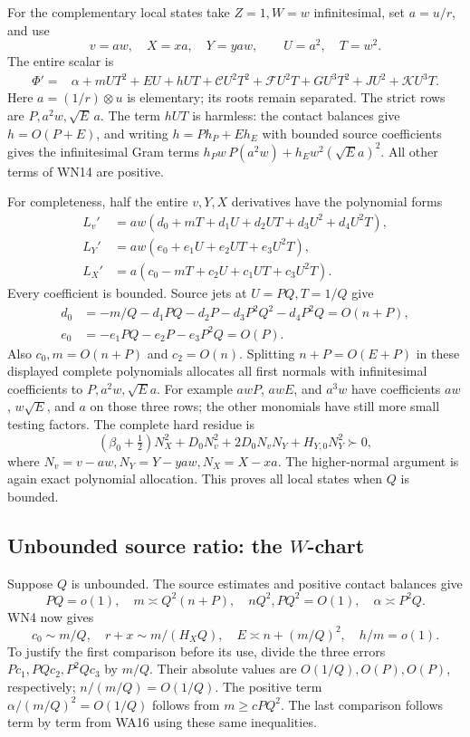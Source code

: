 For the complementary local states take \(Z=1,W=w\) infinitesimal,
set \(a=u/r\), and use
\[
 v=aw,\quad X=xa,\quad Y=yaw,\qquad U=a^2,\quad T=w^2.
 \tag{WN13}
\]
The entire scalar is
\[
\begin{split}
 \Phi'={}&\alpha+mUT^2+EU+hUT+\mathcal C U^2T^2
       +\mathcal F U^2T+GU^3T^2+JU^2+\mathcal K U^3T .
\end{split}\tag{WN14}
\]
Here \(a=(1/r)\otimes u\) is elementary; its roots remain separated.
The strict rows are \(P,a^2w,\sqrt E\,a\).
The term \(hUT\) is harmless: the contact balances give
\(h=O(P+E)\), and writing \(h=Ph_P+Eh_E\) with bounded source
coefficients gives the infinitesimal Gram terms
\(h_Pw\,P(a^2w)+h_Ew^2(\sqrt E a)^2\).
All other terms of WN14 are positive.

For completeness, half the entire \(v,Y,X\) derivatives have
the polynomial forms
\[
\begin{aligned}
 L_v'&=aw(d_0+mT+d_1U+d_2UT+d_3U^2+d_4U^2T),\\
 L_Y'&=aw(e_0+e_1U+e_2UT+e_3U^2T),\\
 L_X'&=a(c_0-mT+c_2U+c_1UT+c_3U^2T).
\end{aligned}\tag{WN15}
\]
Every coefficient is bounded. Source jets at
\(U=PQ,T=1/Q\) give
\[
\begin{split}
d_0&=-m/Q-d_1PQ-d_2P-d_3P^2Q^2-d_4P^2Q=O(n+P),\\
e_0&=-e_1PQ-e_2P-e_3P^2Q=O(P).
\end{split}
\]
Also \(c_0,m=O(n+P)\) and \(c_2=O(n)\).
Splitting \(n+P=O(E+P)\) in these displayed complete polynomials
allocates all first normals with infinitesimal coefficients to
\(P,a^2w,\sqrt E a\). For example \(awP\), \(awE\), and
\(a^3w\) have coefficients \(aw\), \(w\sqrt E\), and \(a\)
on those three rows; the other monomials have still more small
testing factors. The complete hard residue is
\[
 (\beta_0+\tfrac12)N_X^2+
 D_0N_v^2+2D_0N_vN_Y+H_{Y,0}N_Y^2\succ0,
 \tag{WN16}
\]
where \(N_v=v-aw,N_Y=Y-yaw,N_X=X-xa\).
The higher-normal argument is again exact polynomial allocation.
This proves all local states when \(Q\) is bounded.

\subsection{Unbounded source ratio: the \(W\)-chart}

Suppose \(Q\) is unbounded. The source estimates and positive
contact balances give
\[
 PQ=o(1),\quad m\asymp Q^2(n+P),\quad nQ^2,PQ^2=O(1),
 \quad \alpha\asymp P^2Q .
 \tag{WN17}
\]
WN4 now gives
\[
 c_0\sim m/Q,\quad r+x\sim m/(H_XQ),\quad
 E\asymp n+(m/Q)^2,\quad h/m=o(1).
 \tag{WN18}
\]
To justify the first comparison before its use, divide the three
errors \(Pc_1,PQc_2,P^2Qc_3\) by \(m/Q\).
Their absolute values are \(O(1/Q),O(P),O(P)\), respectively;
\(n/(m/Q)=O(1/Q)\). The positive term
\(\alpha/(m/Q)^2=O(1/Q)\) follows from
\(m\geq cPQ^2\). The last comparison follows term by term from
WA16 using these same inequalities.

